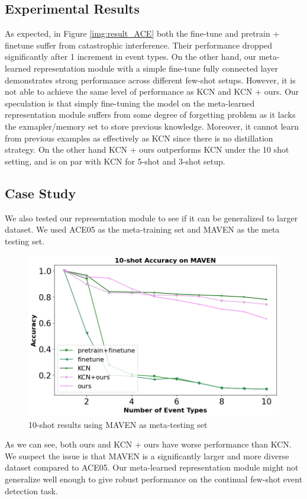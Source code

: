 \subsection{Experimental Results}
As expected,  in Figure \ref{img:result_ACE} both the fine-tune and pretrain + finetune suffer from catastrophic interference. Their performance dropped significantly after 1 increment in event types. On the other hand, our meta-learned representation module with a simple fine-tune fully connected layer demonstrates strong performance across different few-shot setups.  However, it is not able to achieve the same level of performance as KCN and KCN + ours. Our speculation is that simply fine-tuning the model on the meta-learned representation module suffers from some degree of forgetting problem as it lacks the exmapler/memory set to store previous knowledge. Moreover, it cannot learn from previous examples as effectively as KCN since there is no distillation strategy. On the other hand KCN + ours outperforms KCN under the 10 shot setting, and is on par with KCN for 5-shot and 3-shot setup. 

\subsection{Case Study}
We also tested our representation module to see if it can be generalized to larger dataset.  We used ACE05 as the meta-training set and MAVEN as the meta testing set. 

\begin{figure}[h]
\centering
    \includegraphics[scale=0.28]{imgs/ACE_MAVEN.jpg}
    \caption{10-shot results using MAVEN as meta-testing set}
    \label{img:result_MAVEN}
\end{figure}

As we can see,  both ours and KCN + ours have worse performance than KCN.  We suspect the issue is that MAVEN is a significantly larger and more diverse dataset compared to ACE05. Our meta-learned representation module might not generalize well enough to give robust performance on the continual few-shot event detection task.
